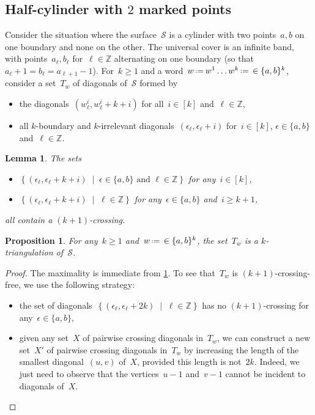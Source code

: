 \documentclass{amsart}
\newtheorem{proposition}[theorem]{Proposition}
\newtheorem{lemma}[theorem]{Lemma}
\theoremstyle{remark}
\newcommand{\Z}{\mathbb{Z}} %
\newcommand{\set}[2]{\left\{ #1 \;\middle|\; #2 \right\}} %
\newcommand{\eqdef}{\mbox{\,\raisebox{0.2ex}{\scriptsize\ensuremath{\mathrm:}}\ensuremath{=}\,}} %
\newcommand{\surface}{\mathcal{S}}
\newcommand{\vincent}[1]{\todo[color=blue!30]{#1 \\ \hfill --- V.}}
\newcommand{\mathias}[1]{\todo[color=red!30]{#1 \\ \hfill --- M.}}
\begin{document}
\subsection{Half-cylinder with $2$ marked points}

Consider the situation where the surface~$\surface$ is a cylinder with two points~$a,b$ on one boundary and none on the other.
\mathias{to be extended}
The universal cover is an infinite band, with points~$a_{\ell}, b_{\ell}$ for~$\ell \in \Z$ alternating on one boundary (so that~$a_\ell+1 = b_\ell = a_{\ell+1}-1$).
For~$k \ge 1$ and a word~$w \eqdef w^1 \dots w^k \eqdef  \in \{a,b\}^k$, consider a set~$T_w$ of diagonals of~$\surface$ formed by
\begin{itemize}
\item the diagonals~$(w^i_\ell, w^i_{\ell}+k+i)$ for all~$i \in [k]$ and~$\ell \in \Z$,
\item all $k$-boundary and $k$-irrelevant diagonals~$(\epsilon_{\ell}, \epsilon_{\ell}+i)$ for~$i \in [k]$, $\epsilon \in \{a,b\}$ and~$\ell \in \Z$.
\end{itemize}
\vincent{Picture}

\begin{lemma}
\label{lem:noTwoDiagonalsEachLevel}
The sets
\begin{itemize}
\item $\set{(\epsilon_\ell, \epsilon_\ell+k+i)}{\epsilon \in \{a,b\} \text{ and } \ell \in \Z}$ for any~$i \in [k]$,
\item $\set{(\epsilon_\ell, \epsilon_\ell+k+i)}{\ell \in \Z}$ for any~$\epsilon \in \{a,b\}$ and~$i \ge k+1$,
\end{itemize}
all contain a $(k+1)$-crossing.
\end{lemma}

\begin{proposition}
For any~$k \ge 1$ and~$w \eqdef  \in \{a,b\}^k$, the set~$T_w$ is a $k$-triangulation of~$\surface$.
\end{proposition}

\begin{proof}
The maximality is immediate from \cref{lem:noTwoDiagonalsEachLevel}.
To see that~$T_w$ is $(k+1)$-crossing-free, we use the following strategy:
\begin{itemize}
\item the set of diagonals~$\set{(\epsilon_\ell, \epsilon_\ell+2k)}{\ell \in \Z}$ has no $(k+1)$-crossing for any~$\epsilon \in \{a,b\}$,
\item given any set~$X$ of pairwise crossing diagonals in~$T_w$, we can construct a new set~$X'$ of pairwise crossing diagonals in~$T_w$ by increasing the length of the smallest diagonal~$(u,v)$ of~$X$, provided this length is not~$2k$. Indeed, we just need to observe that the vertices~$u-1$ and~$v-1$ cannot be incident to diagonals of~$X$.
\qedhere
\end{itemize}
\end{proof}
\end{document}

